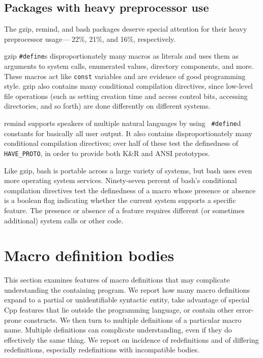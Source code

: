 \documentclass[10pt]{article}
\newcommand{\pkg}[1]{\textsf{#1}}
\begin{document}
\subsection{Packages with heavy preprocessor use}

The \pkg{gzip}, \pkg{remind}, and \pkg{bash} packages deserve
special attention for their heavy preprocessor usage\,---\,22\%, 21\%, and
16\%, respectively.

\pkg{gzip} {\tt \#define}s disproportionately many macros as literals and
uses them as arguments to system calls, enumerated values, directory
components, and more.  These macros act like {\tt const} variables and are
evidence of good programming style.  \pkg{gzip} also contains many
conditional compilation directives, since low-level file operations (such
as setting creation time and access control bits, accessing directories,
and so forth) are done differently on different systems.

\pkg{remind} supports speakers of multiple natural languages by using {\tt
\#define}d constants for basically all user output.  It also contains
disproportionately many conditional compilation directives; over half of
these test the definedness of \verb|HAVE_PROTO|, in order to provide both
K\&R and ANSI prototypes.

Like \pkg{gzip}, \pkg{bash} is portable across a large variety of
systems, but \pkg{bash} uses even more operating system services.
Ninety-seven percent of \pkg{bash}'s conditional compilation directives
test the definedness of a macro whose presence or absence is a boolean
flag indicating whether the current system supports a specific feature.
The presence or absence of a feature requires different (or sometimes
additional) system calls or other code.


\section{Macro definition bodies}
\label{sec:categorization}

This section examines features of macro definitions that may complicate
understanding the containing program.  We report how many macro definitions
expand to a partial or unidentifiable syntactic entity, take advantage of
special Cpp features that lie outside the programming language, or contain
other error-prone constructs.  We then turn to multiple definitions of a
particular macro name.  Multiple definitions can complicate understanding,
even if they do effectively the same thing.  We report on incidence of
redefinitions and of differing redefinitions, especially redefinitions with
incompatible bodies.
\end{document}
